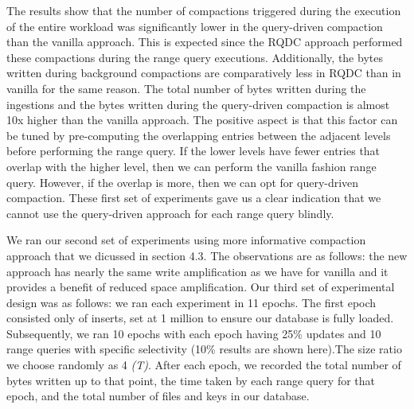 The results show that the number of compactions triggered during the execution of the entire workload was significantly 
lower in the query-driven compaction than the vanilla approach. This is 
expected since the RQDC approach performed these compactions during the range query executions. Additionally, 
the bytes written during background compactions are comparatively less in RQDC than in vanilla for the same reason. 
The total number of bytes written during the ingestions and the bytes written during the query-driven compaction
is almost 10x higher than the vanilla approach. The positive aspect is that this factor can be tuned by pre-computing 
the overlapping entries between the adjacent levels before performing the range query. If the lower levels have fewer entries 
that overlap with the higher level, then we can perform the vanilla fashion range query. However, if the overlap is more, 
then we can opt for query-driven compaction. These first set of experiments gave us a clear indication that we cannot 
use the query-driven approach for each range query blindly.


We ran our second set of experiments using more informative compaction approach that we dicussed in section 4.3. The 
observations are as follows: the new approach has nearly the same write amplification as we have for vanilla and 
it provides a benefit of reduced space amplification. 
Our third set of experimental design was as follows: we ran each experiment in 11 epochs. The first epoch consisted only 
of inserts, set at 1 million to ensure our database is fully loaded. Subsequently, we ran 10 epochs with each epoch having 
25\% updates and 10 range queries with specific selectivity (10\% results are shown here).The size ratio we choose randomly as 4 \textit{(T)}. 
After each epoch, we recorded the total number of bytes written up to that point, the time taken by each range query for 
that epoch, and the total number of files and keys in our database. 

